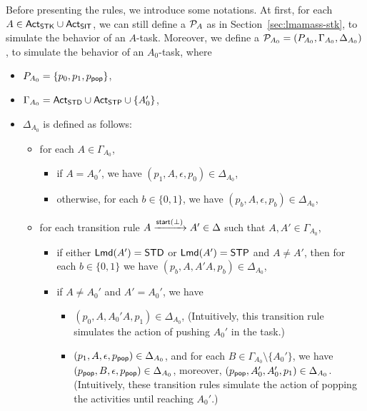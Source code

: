Before presenting the rules, we introduce some notations. At first, for each $A \in {\sf Act}_{\sf STK} \cup {\sf Act}_{\sf SIT}$, we can still define a {\PDS} ${\mathcal{P} }_A$ as in Section~\ref{sec:lmamass-stk}, to simulate the behavior of an $A$-task. 
Moreover, we define a {\PDS} ${\mathcal{P} }_{A_0}=(P_{A_0}, \Gamma_{A_0},\Delta_{A_0})$, to simulate the behavior of an $A_0$-task,  where
\begin{itemize}
    \item $P_{A_0} = \{p_0,p_1,p_{\mathsf{pop}}\}$,
    \item $\Gamma_{A_0} = {\sf Act}_{\sf STD} \cup {\sf Act}_{\sf STP} \cup \{A_0'\}$,
    \item $\Delta_{A_0}$ is defined as follows:
    \begin{itemize}
        \item for each $A\in\Gamma_{A_0}$, 
            \begin{itemize}
                \item if $A=A_0'$, we have $(p_1,A,\epsilon,p_0)\in\Delta_{A_0}$,
                \item otherwise, for each $b\in\{0,1\}$, we have $(p_b,A,\epsilon,p_b)\in\Delta_{A_0}$, 
            \end{itemize}
        \item for each transition rule $A\xrightarrow{{\mathsf{start} }(\bot)}A' \in \Delta$ such that $A, A' \in \Gamma_{A_0}$,
        \begin{itemize}
            \item if either ${\sf Lmd}(A') = \mathsf{STD}$ or ${\sf Lmd}(A')=\mathsf{STP}$ and $A\neq A'$, then for each $b\in\{0,1\}$ we have $(p_b,A,A'A,p_b)\in\Delta_{A_0}$,
            \item if $A\neq A_0'$ and $A'=A_0'$, we have 
            \begin{itemize}
                \item $(p_0, A, A_0'A, p_1) \in \Delta_{A_0}$, (Intuitively, this transition rule simulates the action of pushing $A_0'$ in the task.)
                \item $(p_1, A, \epsilon, p_{\mathsf{pop}}) \in \Delta_{A_0}$, and for each $B\in\Gamma_{A_0}\setminus\{A_0'\}$, we have $(p_{\mathsf{pop}},B,\epsilon,p_{\mathsf{pop}})\in\Delta_{A_0}$, moreover, $(p_{\mathsf{pop}},A_0',A_0',p_1)\in\Delta_{A_0}$. (Intuitively, these transition rules simulate the action of popping the activities until reaching $A_0'$.)
            \end{itemize}
        \end{itemize}
    \end{itemize}
\end{itemize}

